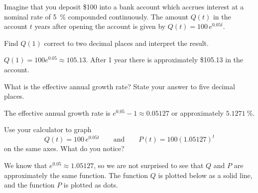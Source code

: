 \begin{problem}
Imagine that you deposit \$100 into a bank account which  accrues interest at a nominal 
rate of \SI{5}{\percent} compounded continuously. The amount $Q(t)$ in the account  $t$ years 
after opening the account is given by $Q(t)=100\,e^{0.05t}$.
			
\begin{subproblem}
	Find $Q(1)$ correct to two decimal places and interpret the result.
	\begin{shortsolution}
		$Q(1)=100e^{0.05}\approx 105.13$. After 1 year there is approximately \$105.13 in the account.
	\end{shortsolution}
\end{subproblem}
\begin{subproblem}
	What is the effective annual growth rate? State your answer to five decimal places.
	\begin{shortsolution}
		The effective annual growth rate is $e^{0.05}-1\approx 0.05127 $ or approximately $\SI{5.1271}{\percent}$.
	\end{shortsolution}
\end{subproblem}
\begin{subproblem}
	Use your calculator to graph
	\[
		Q(t)=100\,e^{0.05t} \qquad \textrm{and} \qquad P(t)=100(1.05127)^t
	\]
	on the same axes. What do you notice?
	\begin{shortsolution}
		We know that $e^{0.05}\approx 1.05127$, so we are not surprised to see that $Q$ and $P$ 
		are approximately the same function. The function $Q$ is plotted below as a solid line, 
		and the function $P$ is plotted as dots.
																			
	\end{shortsolution}
\end{subproblem}
\end{problem}
			

